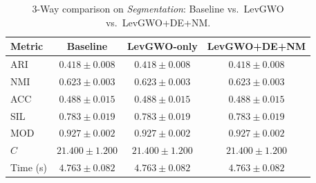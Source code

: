 \begin{table}[htbp]
\centering
\caption{3-Way comparison on \textit{Segmentation}: Baseline vs.\ LevGWO vs.\ LevGWO+DE+NM.}
\label{tab:segmentation_3way}
\begin{tabular}{lccc}
\toprule
Metric & Baseline & LevGWO-only & LevGWO+DE+NM \\
\midrule
ARI & $\mathbf{0.418 \pm 0.008}$ & $\mathbf{0.418 \pm 0.008}$ & $\mathbf{0.418 \pm 0.008}$ \\
NMI & $\mathbf{0.623 \pm 0.003}$ & $\mathbf{0.623 \pm 0.003}$ & $\mathbf{0.623 \pm 0.003}$ \\
ACC & $\mathbf{0.488 \pm 0.015}$ & $\mathbf{0.488 \pm 0.015}$ & $\mathbf{0.488 \pm 0.015}$ \\
SIL & $\mathbf{0.783 \pm 0.019}$ & $\mathbf{0.783 \pm 0.019}$ & $\mathbf{0.783 \pm 0.019}$ \\
MOD & $\mathbf{0.927 \pm 0.002}$ & $\mathbf{0.927 \pm 0.002}$ & $\mathbf{0.927 \pm 0.002}$ \\
$C$ & $21.400 \pm 1.200$ & $21.400 \pm 1.200$ & $21.400 \pm 1.200$ \\
Time (s) & $4.763 \pm 0.082$ & $4.763 \pm 0.082$ & $4.763 \pm 0.082$ \\
\bottomrule
\end{tabular}
\end{table}